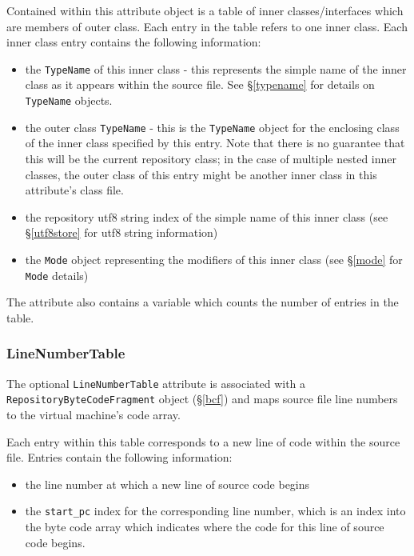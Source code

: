 \documentclass{report}
\begin{document}
Contained within this attribute object is a table of inner classes/interfaces
which are members of outer class. Each entry in the table refers to one
inner class. Each inner class entry contains the following information:

\begin{itemize}
	\item the \texttt{TypeName} of this inner class - this represents the
	      simple name of the inner class as it appears within the
	      source file. See \S \ref{typename} for details on
	      \texttt{TypeName} objects.
	\item the outer class \texttt{TypeName} - this is the 
	      \texttt{TypeName} object for the enclosing class of the inner 
	      class specified by this entry. Note that there is no guarantee 
	      that this will be the current repository class; in the case of
	      multiple nested inner classes, the outer class of this
              entry might be another inner class in this attribute's class 
	      file.
	\item the repository utf8 string index of the simple name of this inner
	      class (see \S \ref{utf8store} for utf8 string information)
	\item the \texttt{Mode} object representing the modifiers of this
	      inner class (see \S \ref{mode} for \texttt{Mode} details)
\end{itemize}

The attribute also contains a variable which counts the number of entries in
the table.

\subsubsection{LineNumberTable}

The optional \texttt{LineNumberTable} attribute is associated with a
\texttt{Re\-pos\-i\-tory\-Byte\-Code\-Frag\-ment} object (\S \ref{bcf}) and
maps source file line numbers to the virtual machine's code array.

Each entry within this table corresponds to a new line of code within the 
source file. Entries contain the following information:

\begin{itemize}
	\item the line number at which a new line of source code begins
	\item the \texttt{start\_pc} index for the corresponding line number, 
	      which is an index into the byte code array which indicates where
	      the code for this line of source code begins.
\end{itemize}
\end{document}

